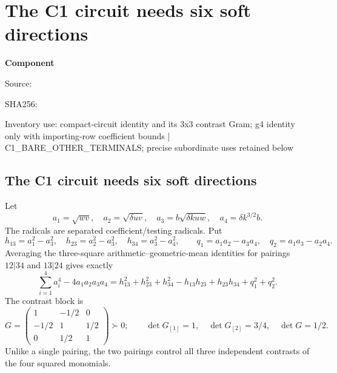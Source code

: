 \chapter{The C1 circuit needs six soft directions}
\label{component:p58894e12bcef}
\noindent\textbf{Component }\par
{\small\noindent Source: \par}
{\small\noindent SHA256: \par}
{\small\noindent Inventory use: compact-circuit identity and its 3x3 contrast Gram; g4 identity only with importing-row coefficient bounds | C1\_\allowbreak{}BARE\_\allowbreak{}OTHER\_\allowbreak{}TERMINALS; precise subordinate uses retained below\par}
\medskip
\section{The C1 circuit needs six soft directions}
Let
\[
a_1=\sqrt{wv},\quad a_2=\sqrt{\delta uv},\quad
a_3=b\sqrt{\delta kuw},\quad a_4=\delta k^{3/2}b.
\]
The radicals are separated coefficient/testing radicals. Put
\[
h_{13}=a_1^2-a_3^2,\quad h_{23}=a_2^2-a_3^2,\quad
h_{34}=a_3^2-a_4^2,
\qquad q_1=a_1a_2-a_3a_4,\quad q_2=a_1a_3-a_2a_4.
\]
Averaging the three-square arithmetic--geometric-mean identities for
pairings $12|34$ and $13|24$ gives exactly
\begin{equation}
\sum_{i=1}^4a_i^4-4a_1a_2a_3a_4
=h_{13}^2+h_{23}^2+h_{34}^2-h_{13}h_{23}+h_{23}h_{34}
 +q_1^2+q_2^2.\label{p58894e12bcef:eq:compact-circuit}
\end{equation}
The contrast block is
\[
G=\begin{pmatrix}1&-1/2&0\\-1/2&1&1/2\\0&1/2&1\end{pmatrix}\succ0;
\qquad \det G_{[1]}=1,\quad\det G_{[2]}=3/4,\quad\det G=1/2.
\]
Unlike a single pairing, the two pairings control all three independent
contrasts of the four squared monomials.

